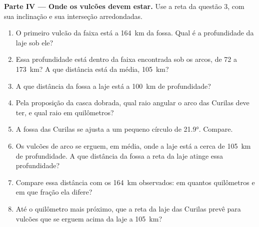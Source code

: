 \begin{problem}
\medskip
\noindent\textbf{Parte IV --- Onde os vulcões devem estar.} Use a reta da questão 3, com sua inclinação e sua interseção arredondadas.
\begin{enumerate}[resume]
  \item O primeiro vulcão da faixa está a \qty{164}{km} da fossa. Qual é a profundidade da laje sob ele?
  \item Essa profundidade está dentro da faixa encontrada sob os arcos, de 72 a \qty{173}{km}? A que distância está da média, \qty{105}{km}?
  \item A que distância da fossa a laje está a \qty{100}{km} de profundidade?
  \item Pela proposição da casca dobrada, qual raio angular o arco das Curilas deve ter, e qual raio em quilômetros?
  \item A fossa das Curilas se ajusta a um pequeno círculo de \ang{21.9}. Compare.
  \item Os vulcões de arco se erguem, em média, onde a laje está a cerca de \qty{105}{km} de profundidade. A que distância da fossa a reta da laje atinge essa profundidade?
  \item Compare essa distância com os \qty{164}{km} observados: em quantos quilômetros e em que fração ela difere?
  \item Até o quilômetro mais próximo, que  a reta da laje das Curilas prevê para vulcões que se erguem acima da laje a \qty{105}{km}?
\end{enumerate}
\end{problem}
